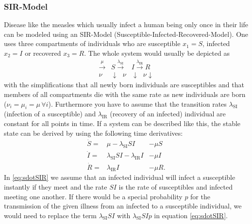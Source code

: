 \subsubsection{SIR-Model}
Disease like the measles which usually infect a human being only once in their life can be modeled using an SIR-Model (Susceptible-Infected-Recovered-Model). One uses three compartments of individuals who are susceptible $x_1 = S$, infected $x_2=I$ or recovered $x_3=R$. The whole system would usually be depicted as 
\begin{eqnarray}
\xrightarrow{\mu} &S \xrightarrow{\lambda_\text{SI}} &I  \xrightarrow{\lambda_\text{IR}} R  \\
{\nu} & \downarrow \text{         }\nu &\downarrow \text{  } {\nu} \downarrow \nonumber
\end{eqnarray}
with the simplifications that all newly born individuals are susceptibles and that members of all compartments die with the same rate as new individuals are born ($\nu_i = \mu_i = \mu\, \forall i$). Furthermore you have to assume that the transition rates $\lambda_\text{SI}$ (infection of a susceptible) and $\lambda_\text{IR}$ (recovery of an infected) individual are constant for all points in time.
If a system can be described like this, the stable state can be derived by using the following time derivatives:
\begin{eqnarray}
\dot{S} =& \mu -\lambda_\text{SI} SI &-  \mu S  \label{eq:sdotSIR}\\ 
\dot{I} =& \lambda_\text{SI} SI - \lambda_\text{IR} I  &-\mu I \\
\dot{R} =& \lambda_\text{IR} I & -\mu R. \label{eq:rdotsir}
\end{eqnarray}
In \ref{eq:sdotSIR} we assume that an infected individual will infect a susceptible instantly if they meet and the rate $SI$ is the rate of susceptibles and infected meeting one another. If there would be a special probability $p$ for the transmission of the given illness from an infected to a susceptible individual, we would need to replace the term $\lambda_\text{SI} SI$ with $\lambda_\text{SI} S I p$ in equation \ref{eq:sdotSIR}.
